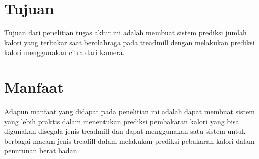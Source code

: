 \section{Tujuan}
\label{sec:Tujuan}

Tujuan dari penelitian tugas akhir ini adalah membuat sistem prediksi jumlah kalori yang terbakar saat berolahraga pada treadmill dengan melakukan prediksi kalori menggunakan citra dari kamera.


\section{Manfaat}

Adapun manfaat yang didapat pada penelitian ini adalah dapat membuat sistem yang lebih praktis dalam menentukan prediksi pembakaran kalori yang bisa digunakan disegala jenis treadmill dan dapat menggunakan satu sistem untuk berbagai macam jenis treadill dalam melakukan prediksi pebakaran kalori dalam penurunan berat badan.
